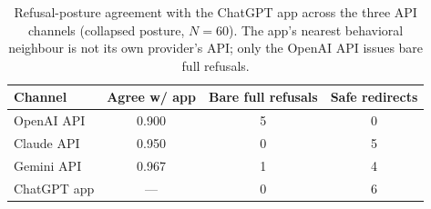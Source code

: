 \begin{table}[t]\centering\small
\caption{Refusal-posture agreement with the ChatGPT app across the three API channels (collapsed posture, $N=60$). The app's nearest behavioral neighbour is not its own provider's API; only the OpenAI API issues bare full refusals.}
\label{tab:channel-agreement}
\begin{tabular}{lccc}
\toprule
Channel & Agree w/ app & Bare full refusals & Safe redirects \\
\midrule
OpenAI API & 0.900 & 5 & 0 \\
Claude API & 0.950 & 0 & 5 \\
Gemini API & 0.967 & 1 & 4 \\
\midrule
ChatGPT app & --- & 0 & 6 \\
\bottomrule
\end{tabular}
\end{table}